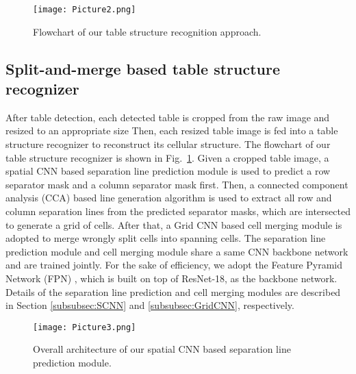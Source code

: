 \documentclass[final,3p,times,twocolumn]{elsarticle}
\begin{document}
\begin{figure}[t]
    \centering
    \setlength{\abovecaptionskip}{-0.2cm}
    \texttt{[image: Picture2.png]}
    \caption{Flowchart of our table structure recognition approach.}
    \label{fig:Flowchart_of_TSR}
\end{figure}

\subsection{Split-and-merge based table structure recognizer}
\label{subsec:TSR_method}
After table detection, each detected table is cropped from the raw image and resized to an appropriate size {\color{black}{to ensure that there is enough inter-line spacing for separation line prediction.}} Then, each resized table image is fed into a table structure recognizer to reconstruct its cellular structure. 
The flowchart of our table structure recognizer is shown in Fig.~\ref{fig:Flowchart_of_TSR}. Given a cropped table image, a spatial CNN based separation line prediction module is used to predict a row separator mask and a column separator mask first. Then, a connected component analysis (CCA) based line generation algorithm is used to extract all row and column separation lines from the predicted separator masks, which are intersected to generate a grid of cells. After that, a Grid CNN based cell merging module is adopted to merge wrongly split cells into spanning cells. The separation line prediction module and cell merging module share a same CNN backbone network and are trained jointly. For the sake of efficiency, we adopt the Feature Pyramid Network (FPN) \cite{lin2017feature}, which is built on top of ResNet-18, as the backbone network. Details of the separation line prediction and cell merging modules are described in Section \ref{subsubsec:SCNN} and \ref{subsubsec:GridCNN}, respectively.

\begin{figure*}[t]
    \centering
    \setlength{\abovecaptionskip}{-0.2cm}
    \texttt{[image: Picture3.png]}
    \caption{Overall architecture of our spatial CNN based separation line prediction module.}
    \label{fig:SCNN}
\end{figure*}
\end{document}
